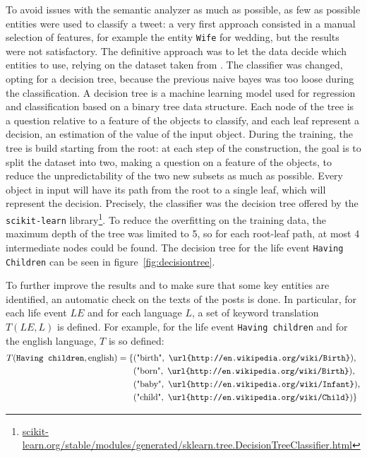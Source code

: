 To avoid issues with the semantic analyzer as much as possible, as few as possible entities were used to classify a tweet: a very first approach consisted in a manual selection of features, for example the entity \texttt{Wife} for wedding, but the results were not satisfactory. The definitive approach was to let the data decide which entities to use, relying on the dataset taken from \cite{dickinson2015identifying}. The classifier was changed, opting for a decision tree, because the previous naive bayes was too loose during the classification. A decision tree is a machine learning model used for regression and classification based on a binary tree data structure. Each node of the tree is a question relative to a feature of the objects to classify, and each leaf represent a decision, an estimation of the value of the input object. During the training, the tree is build starting from the root: at each step of the construction, the goal is to split the dataset into two, making a question on a feature of the objects, to reduce the unpredictability of the two new subsets as much as possible. Every object in input will have its path from the root to a single leaf, which will represent the decision. Precisely, the classifier was the decision tree offered by the \texttt{scikit-learn} library\footnote{\url{scikit-learn.org/stable/modules/generated/sklearn.tree.DecisionTreeClassifier.html}}. To reduce the overfitting on the training data, the maximum depth of the tree was limited to 5, so for each root-leaf path, at most 4 intermediate nodes could be found. The decision tree for the life event \texttt{Having Children} can be seen in figure~\ref{fig:decisiontree}.

To further improve the results and to make sure that some key entities are identified, an automatic check on the texts of the posts is done. In particular, for each life event $LE$ and for each language $L$, a set of keyword translation $T(LE, L)$ is defined. For example, for the life event \texttt{Having children} and for the english language, $T$ is so defined:
\begin{equation*}
\begin{split}
T(\text{\texttt{Having children}}, \text{english}) = \{&(\text{"birth"}, \text{ \texttt{\url{http://en.wikipedia.org/wiki/Birth}}}),\\&(\text{"born"}, \text{ \texttt{\url{http://en.wikipedia.org/wiki/Birth}}}),\\&(\text{"baby"}, \text{ \texttt{\url{http://en.wikipedia.org/wiki/Infant}}}),\\&(\text{"child"}, \text{ \texttt{\url{http://en.wikipedia.org/wiki/Child}}})\}
\end{split}
\end{equation*}

